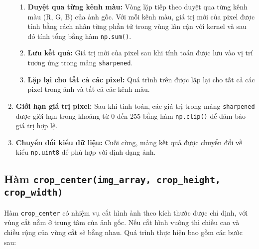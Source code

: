 \begin{enumerate}
\begin{enumerate}
		      \item \textbf{Duyệt qua từng kênh màu:}
		            Vòng lặp tiếp theo duyệt qua từng kênh màu (R, G, B) của ảnh gốc. Với mỗi kênh màu, giá trị mới của pixel được tính bằng cách nhân từng phần tử trong vùng lân cận với kernel và sau đó tính tổng bằng hàm \texttt{np.sum()}.

		      \item \textbf{Lưu kết quả:}
		            Giá trị mới của pixel sau khi tính toán được lưu vào vị trí tương ứng trong mảng \texttt{sharpened}.

		      \item \textbf{Lặp lại cho tất cả các pixel:}
		            Quá trình trên được lặp lại cho tất cả các pixel trong ảnh và tất cả các kênh màu.



	      \end{enumerate}

	\item \textbf{Giới hạn giá trị pixel:}
	      Sau khi tính toán, các giá trị trong mảng \texttt{sharpened} được giới hạn trong khoảng từ 0 đến 255 bằng hàm \texttt{np.clip()} để đảm bảo giá trị hợp lệ.

	\item \textbf{Chuyển đổi kiểu dữ liệu:}
	      Cuối cùng, mảng kết quả được chuyển đổi về kiểu \texttt{np.uint8} để phù hợp với định dạng ảnh.

\end{enumerate}

\subsection{Hàm \texttt{crop\_center(img\_array, crop\_height, crop\_width)}}
Hàm \texttt{crop\_center} có nhiệm vụ cắt hình ảnh theo kích thước được chỉ định, với vùng cắt nằm ở trung tâm của ảnh gốc. Nếu cắt hình vuông thì chiều cao và chiều rộng của vùng cắt sẽ bằng nhau. Quá trình thực hiện bao gồm các bước sau:


